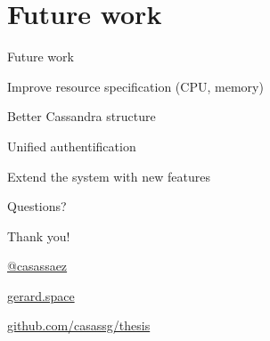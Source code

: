 \documentclass{beamer}
\newenvironment{wideitemize}{\itemize\addtolength{\itemsep}{20pt}}{\enditemize}
\newcommand{\hugeframedouble}[2]{
\begin{frame}[c]
  \begin{center}
    \huge\textcolor{title}{#1}
    \vfill

    \normalsize #2

  \end{center}

\end{frame}
}
\newcommand{\hugeframe}[1]{
\begin{frame}[c]
  \begin{center}
    \huge\textcolor{title}{#1}
  \end{center}

\end{frame}
}
\begin{document}
\section{Future work}
\begin{frame}{Future work}
\begin{wideitemize}
  \item Improve resource specification (CPU, memory)
  \item Better Cassandra structure
  \item Unified authentification
  \item Extend the system with new features
\end{wideitemize}
\end{frame}





\hugeframe{Questions?}


\hugeframedouble{Thank you!}{
\begin{description}
  \addtolength{\itemsep}{5pt}
  \item[\textbf{Twitter}]  \href{http://twitter.com/casassaez}{@casassaez}
  \item[\textbf{Website}]  \href{http://gerard.space}{gerard.space}
  \item[\textbf{Repo}] \href{http://github.com/casassg/thesis}{github.com/casassg/thesis}

\end{description} 

}



\end{document}
